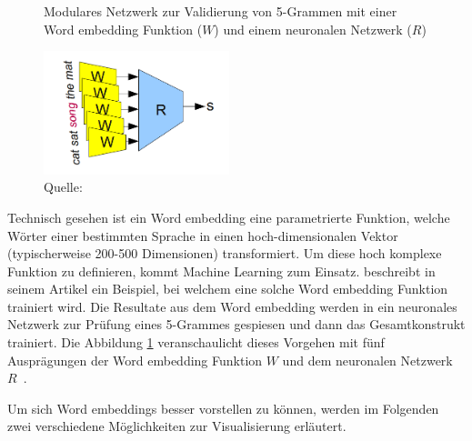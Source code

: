 \begin{figure} 
    \captionsetup{width=.9\linewidth}
    \caption[Modulares Netzwerk zur Validierung von 5-Grammen]{Modulares Netzwerk zur Validierung von 5-Grammen mit einer Word embedding Funktion ($W$) und einem neuronalen Netzwerk ($R$)}
    \label{wordembeddingtraining}
    \centering
    \includegraphics[width=0.48\textwidth]{graphics/wordembeddingtraining.png}
    \caption*{Quelle: \textcite{Olah2014b}}
\end{figure}
Technisch gesehen ist ein Word embedding eine parametrierte Funktion, welche Wörter einer bestimmten Sprache in einen hoch-dimensionalen Vektor (typischerweise 200-500 Dimensionen) transformiert. Um diese hoch komplexe Funktion zu definieren, kommt Machine Learning zum Einsatz. \textcite{Olah2014b} beschreibt in seinem Artikel ein Beispiel, bei welchem eine solche Word embedding Funktion trainiert wird. Die Resultate aus dem Word embedding werden in ein neuronales Netzwerk zur Prüfung eines 5-Grammes gespiesen und dann das Gesamtkonstrukt trainiert. Die Abbildung \ref{wordembeddingtraining} veranschaulicht dieses Vorgehen mit fünf Ausprägungen der Word embedding Funktion $W$ und dem neuronalen Netzwerk $R$~\autocite{Olah2014b}.

Um sich Word embeddings besser vorstellen zu können, werden im Folgenden zwei verschiedene Möglichkeiten zur Visualisierung erläutert.

